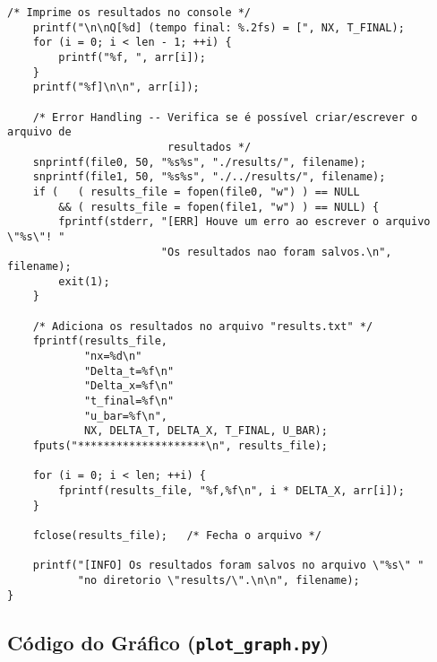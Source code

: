 \begin{Verbatim}[fontsize=\footnotesize]
    /* Imprime os resultados no console */
    printf("\n\nQ[%d] (tempo final: %.2fs) = [", NX, T_FINAL);
    for (i = 0; i < len - 1; ++i) {
        printf("%f, ", arr[i]);
    }
    printf("%f]\n\n", arr[i]);

    /* Error Handling -- Verifica se é possível criar/escrever o arquivo de
                         resultados */
    snprintf(file0, 50, "%s%s", "./results/", filename);
    snprintf(file1, 50, "%s%s", "./../results/", filename);
    if (   ( results_file = fopen(file0, "w") ) == NULL
        && ( results_file = fopen(file1, "w") ) == NULL) {
        fprintf(stderr, "[ERR] Houve um erro ao escrever o arquivo \"%s\"! "
                        "Os resultados nao foram salvos.\n", filename);
        exit(1);
    }

    /* Adiciona os resultados no arquivo "results.txt" */
    fprintf(results_file,
            "nx=%d\n"
            "Delta_t=%f\n"
            "Delta_x=%f\n"
            "t_final=%f\n"
            "u_bar=%f\n",
            NX, DELTA_T, DELTA_X, T_FINAL, U_BAR);
    fputs("********************\n", results_file);

    for (i = 0; i < len; ++i) {
        fprintf(results_file, "%f,%f\n", i * DELTA_X, arr[i]);
    }

    fclose(results_file);   /* Fecha o arquivo */

    printf("[INFO] Os resultados foram salvos no arquivo \"%s\" "
           "no diretorio \"results/\".\n\n", filename);
}
\end{Verbatim}

\subsection{Código do Gráfico (\texttt{plot\_graph.py})}

